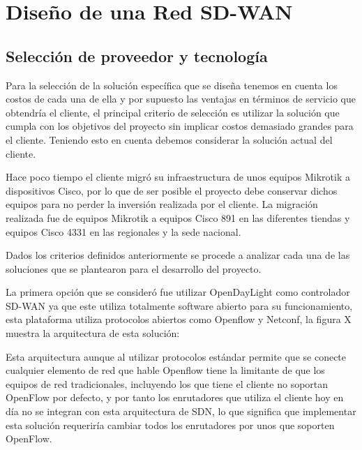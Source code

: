 \chapter{Diseño de una Red SD-WAN}
\label{cha:Diseño de una Red SD-WAN}

\section{Selección de proveedor y tecnología} %
\label{sec:Selección de proveedor y tecnología}

Para la selección de la solución específica que se diseña tenemos en cuenta los costos de cada una de ella y por supuesto las ventajas en términos de servicio que obtendría el cliente, el principal criterio de selección es utilizar la solución que cumpla con los objetivos del proyecto sin implicar costos demasiado grandes para el cliente. Teniendo esto en cuenta debemos considerar la solución actual del cliente.

Hace poco tiempo el cliente migró su infraestructura de unos equipos Mikrotik a dispositivos Cisco, por lo que de ser posible el proyecto debe conservar dichos equipos para no perder la inversión realizada por el cliente. La migración realizada fue de equipos Mikrotik a equipos Cisco 891 en las diferentes tiendas y equipos Cisco 4331 en las regionales y la sede nacional.

Dados los criterios definidos anteriormente se procede a analizar cada una de las soluciones que se plantearon para el desarrollo del proyecto.

La primera opción que se consideró fue utilizar OpenDayLight como controlador SD-WAN ya que este utiliza totalmente software abierto para su funcionamiento, esta plataforma utiliza protocolos abiertos como  Openflow y Netconf, la figura X muestra la arquitectura de esta solución:

Esta arquitectura aunque al utilizar protocolos estándar permite que se conecte cualquier elemento de red que hable Openflow tiene la limitante de que los equipos de red tradicionales, incluyendo los que tiene el cliente no soportan OpenFlow por defecto, y por tanto los enrutadores que utiliza el cliente hoy en día no se integran con esta arquitectura de SDN, lo que significa que implementar esta solución requeriría cambiar todos los enrutadores por unos que soporten OpenFlow.

